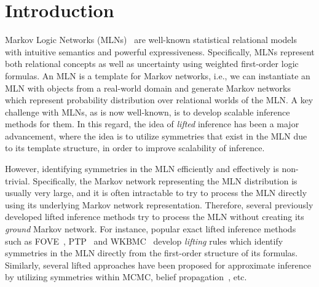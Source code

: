 \section{Introduction}

Markov Logic Networks (MLNs)~\cite{domingos&lowd09} are well-known statistical relational models with intuitive semantics and powerful expressiveness. Specifically, MLNs represent both relational concepts as well as uncertainty using weighted first-order logic formulas. An MLN is a template for Markov networks, i.e., we can instantiate an MLN with objects from a real-world domain and generate Markov networks which represent probability distribution over relational worlds of the MLN. A key challenge with MLNs, as is now well-known, is to develop scalable inference methods for them.  In this regard, the idea of {\em lifted} inference has been a major advancement, where the idea is to utilize symmetries that exist in the MLN due to its template structure, in order to improve scalability of inference.

However, identifying symmetries in the MLN efficiently and effectively is non-trivial. Specifically, the Markov network representing the MLN distribution is usually very large, and it is often intractable to try to process the MLN directly using its underlying Markov network representation. Therefore, several previously developed lifted inference methods try to process the MLN without creating its {\em ground} Markov network. For instance, popular exact lifted inference methods such as FOVE~\cite{braz07}, PTP~\cite{gogate&domingos11b} and WKBMC~\cite{broeck&al11} develop {\em lifting} rules which identify symmetries in the MLN directly from the first-order structure of its formulas. Similarly, several lifted approaches have been proposed for approximate inference by utilizing symmetries within MCMC\cite{niepert12,venugopal&gogate12}, belief propagation~\cite{singla&domingos08,ahmadi&al13}, etc.

